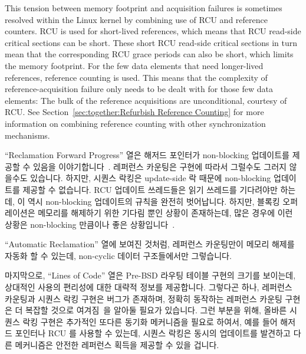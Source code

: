 This tension between memory footprint and acquisition
failures is sometimes resolved within the Linux kernel by combining use
of RCU and reference counters.
RCU is used for short-lived references, which means that RCU read-side
critical sections can be short.
These short RCU read-side critical sections in turn mean that the corresponding
RCU grace periods can also be short, which limits the memory footprint.
For the few data elements that need longer-lived references, reference
counting is used.
This means that the complexity of reference-acquisition failure only
needs to be dealt with for those few data elements:  The bulk of
the reference acquisitions are unconditional, courtesy of RCU.
See Section~\ref{sec:together:Refurbish Reference Counting}
for more information on combining reference counting with other
synchronization mechanisms.
\fi

``Reclamation Forward Progress'' 열은 해저드 포인터가 non-blocking
업데이트를 제공할 수 있음을 이야기합니다~\cite{MagedMichael04a,HerlihyLM02}.
레퍼런스 카운팅은 구현에 따라서 그럴수도 그러지 않을수도 있습니다.
하지만, 시퀀스 락킹은 update-side 락 때문에 non-blocking 업데이트를 제공할 수
없습니다.
RCU 업데이트 쓰레드들은 읽기 쓰레드를 기다려야만 하는데, 이 역시 non-blocking
업데이트의 규칙을 완전히 벗어납니다.
하지만, 블록킹 오퍼레이션은 메모리를 해제하기 위한 기다림 뿐인 상황이
존재하는데, 많은 경우에 이런 상황은 non-blocking 만큼이나 좋은
상황입니다~\cite{MathieuDesnoyers2012URCU}.
\iffalse

The ``Reclamation Forward Progress'' row shows that hazard pointers
can provide non-blocking updates~\cite{MagedMichael04a,HerlihyLM02}.
Reference counting might or might not, depending on the implementation.
However, sequence locking cannot provide non-blocking updates, courtesy
of its update-side lock.
RCU updaters must wait on readers, which also rules out fully non-blocking
updates.
However, there are situations in which the only blocking operation is
a wait to free memory, which results in an situation that, for many
purposes, is as good as non-blocking~\cite{MathieuDesnoyers2012URCU}.
\fi

``Automatic Reclamation'' 열에 보여진 것처럼, 레퍼런스 카운팅만이 메모리 해제를
자동화 할 수 있는데, non-cyclic 데이터 구조들에서만 그렇습니다.

마지막으로, ``Lines of Code'' 열은 Pre-BSD 라우팅 테이블 구현의 크기를
보이는데, 상대적인 사용의 편리성에 대한 대략적 정보를 제공합니다.
그렇다곤 하나, 레퍼런스 카운팅과 시퀀스 락킹 구현은 버그가 존재하며, 정확히
동작하는 레퍼런스 카운팅 구현은 더 복잡할 것으로
여겨짐~\cite{Valois95a,MagedMichael95a}을 알아둘 필요가 있습니다.
그런 부분을 위해, 올바른 시퀀스 락킹 구현은 추가적인 또다른 동기화 메커니즘을
필요로 하여서, 예를 들어 해저드 포인터나 RCU 를 사용할 수 있는데, 시퀀스 락킹은
동시의 업데이트를 발견하고 다른 메커니즘은 안전한 레퍼런스 획득을 제공할 수
있을 겁니다.
\iffalse


